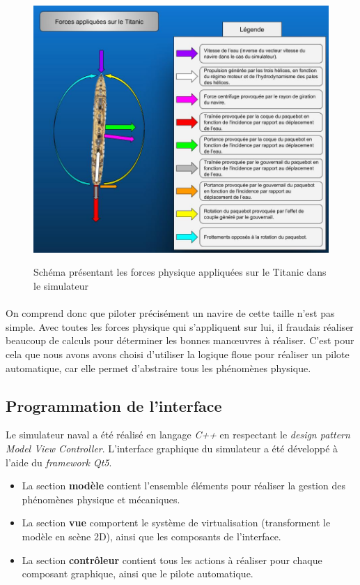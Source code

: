 \documentclass[a4paper,11pt]{article}
\begin{document}
    \begin{figure}[H]
        \begin{center}
            \caption{Schéma présentant les forces physique appliquées sur le Titanic dans le simulateur}
            \includegraphics[scale=0.56]{assets/Isaac_vs_Titanic.jpg}
            \label{fig:titanicForces}
        \end{center}
    \end{figure}
    \paragraph{}
    On comprend donc que piloter précisément un navire de cette taille n'est pas simple. Avec toutes les forces physique qui s'appliquent sur lui, il fraudais réaliser beaucoup de calculs pour déterminer les bonnes manœuvres à réaliser. C'est pour cela que nous avons avons choisi d'utiliser la logique floue pour réaliser un pilote automatique, car elle permet d’abstraire tous les phénomènes physique.

    \subsection{Programmation de l'interface}
    Le simulateur naval a été réalisé en langage \textit{C++} en respectant le \textit{design pattern Model View Controller}. L'interface graphique du simulateur a été développé à l'aide du \textit{framework Qt5}.

    \begin{itemize}
        \item La section \textbf{modèle} contient l'ensemble éléments pour réaliser la gestion des phénomènes physique et mécaniques.
        \item La section \textbf{vue} comportent le système de virtualisation (transforment le modèle en scène 2D), ainsi que les composants de l'interface.
        \item La section \textbf{contrôleur} contient tous les actions à réaliser pour chaque composant graphique, ainsi que le pilote automatique.
    \end{itemize}
\end{document}
